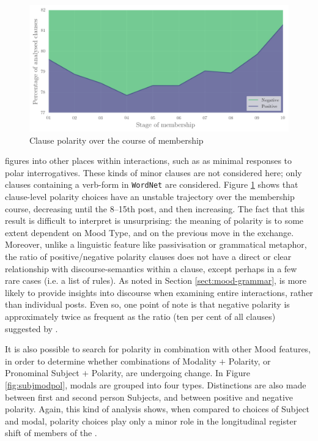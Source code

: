 \begin{figure}[htb]
    \centering
    \includegraphics[width=.7\textwidth]{../images/polarity-area.png}
    \caption{Clause polarity over the course of membership}
    \label{fig:polarity}
    \end{figure}

 figures into other places within interactions, such as as minimal responses to polar interrogatives. These kinds of minor clauses are not considered here; only clauses containing a verb\hyp{}form in \texttt{WordNet} are considered. Figure \ref{fig:polarity} shows that clause\hyp{}level polarity choices have an unstable trajectory over the membership course, decreasing until the 8--15th post, and then increasing. The fact that this result is difficult to interpret is unsurprising: the meaning of polarity is to some extent dependent on Mood Type, and on the previous move in the exchange. Moreover, unlike a linguistic feature like passivisation or grammatical metaphor, the ratio of positive\slash negative polarity clauses does not have a direct or clear relationship with \glspl{discourse-semantic} within a clause, except perhaps in a few rare cases (i.e. a list of rules). As noted in Section \ref{sect:mood-grammar},  is more likely to provide insights into discourse when examining entire interactions, rather than individual \glspl{post}. Even so, one point of note is that negative polarity is approximately twice as frequent as the ratio (ten per cent of all clauses) suggested by \textcite{halliday_introduction_2004}.

It is also possible to search for polarity in combination with other Mood features, in order to determine whether combinations of Modality $+$ Polarity, or Pronominal Subject $+$ Polarity, are undergoing change. In Figure \ref{fig:subjmodpol}, modals are grouped into four types. Distinctions are also made between first and second person Subjects, and between positive and negative polarity. Again, this kind of analysis shows, when compared to choices of Subject and modal, polarity choices play only a minor role in the longitudinal register shift of \glspl{member} of the .

